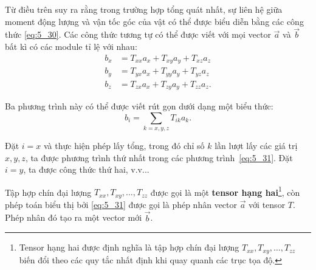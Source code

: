 Từ điều trên suy ra rằng trong trường hợp tổng quát nhất, sự liên hệ giữa moment động lượng và vận tốc góc của vật có thể được biểu diễn bằng các công thức \eqref{eq:5_30}. Các công thức tương tự có thể được viết với mọi vector $\vec{a}$ và $\vec{b}$ bất kì có các module tỉ lệ với nhau:
\begin{align}
	b_x &= T_{xx} a_x + T_{xy} a_y + T_{xz} a_z\nonumber\\
	b_y &= T_{yx} a_x + T_{yy} a_y + T_{yz} a_z \label{eq:5_31} \\
	b_z &= T_{zx} a_x + T_{zy} a_y + T_{zz} a_z.\nonumber
\end{align}

\noindent
Ba phương trình này có thể được viết rút gọn dưới dạng một biểu thức:
\vspace{-12pt}
\begin{equation}\label{eq:5_32}
b_i = \sum_{k=x,y,z} T_{ik} a_k.
\end{equation}

\noindent
Đặt $i=x$ và thực hiện phép lấy tổng, trong đó chỉ số $k$ lần lượt lấy các giá trị $x,y,z$, ta được phương trình thứ nhất trong các phương trình~\eqref{eq:5_31}. Đặt $i=y$, ta được công thức thứ hai, v.v...

Tập hợp chín đại lượng $T_{xx}, T_{xy}, \ldots, T_{zz}$ được gọi là một \textbf{tensor hạng hai}\footnote{Tensor hạng hai được định nghĩa là tập hợp chín đại lượng $T_{xx}, T_{xy}, \ldots, T_{zz}$ biến đổi theo các quy tắc nhất định khi quay quanh các trục tọa độ.}, còn phép toán biểu thị bởi \eqref{eq:5_31} được gọi là phép nhân vector $\vec{a}$ với tensor $T$. Phép nhân đó tạo ra một vector mới $\vec{b}$.

